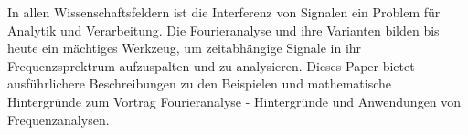 In allen Wissenschaftsfeldern ist die Interferenz von Signalen ein Problem für Analytik und Verarbeitung. Die Fourieranalyse und ihre Varianten bilden bis heute ein mächtiges Werkzeug, um zeitabhängige Signale in ihr Frequenzsprektrum aufzuspalten und zu analysieren. Dieses Paper bietet ausführlichere Beschreibungen zu den Beispielen und mathematische Hintergründe zum Vortrag \glqq Fourieranalyse - Hintergründe und Anwendungen von Frequenzanalysen\grqq.
